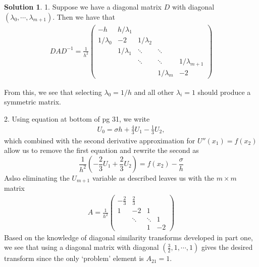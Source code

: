 \documentclass[12pt]{article}
\theoremstyle{definition}
\newtheorem{sol}{Solution}
\theoremstyle{remark}
\begin{document}
\begin{sol}
    1. Suppose we have a diagonal matrix $D$ with diagonal $(\lambda_{0}, \cdots, \lambda_{m+1})$. Then we have that
    \begin{align*}
    D A D^{-1} = 
\frac{1}{h^2} \left( \begin{array}{ccccc}
-h & h  / \lambda_{1} &        &        &      \\
1 / \lambda_{0} & -2  & 1 / \lambda_{2}      &        &      \\
   & 1 / \lambda_{1}  & \ddots & \ddots &      \\
   &    & \ddots & \ddots & 1 / \lambda_{m+1}    \\
   &    &        & 1 / \lambda_{m}     & -2 \end{array} \right)
    \end{align*}
\end{sol}
From this, we see that selecting $\lambda_{0} = 1 / h$ and all other $\lambda_{i} = 1$ should produce a symmetric matrix.


2. Using equation at bottom of pg 31, we write
\begin{align*}
U_{0} = \sigma h + \frac{4}{3}U_{1} - \frac{1}{3}U_{2},
\end{align*}
which combined with the second derivative approximation for $U''(x_{1}) = f(x_{2})$ allow us to remove the first equation and rewrite the second as
\begin{equation*}
    \frac{1}{h^{2}} \left(- \frac{2}{3} U_{1} + \frac{2}{3}U_{2}\right ) = f(x_{2}) - \frac{\sigma}{h}
\end{equation*}
Aslso eliminating the $U_{m+1}$ variable as described leaves us with the $m \times m$ matrix
\begin{align*}
A = \frac{1}{h^2} \left( \begin{array}{ccccc}
        -\frac{2}{3} & \frac{2}{3}      &   &          \\
    1  & -2 & 1 &      \\
       & \ddots & \ddots & 1    \\
       &        & 1      & -2 \end{array} \right)
\end{align*}
Based on the knowledge of diagonal similarity transforms developed in part one, we see that using a diagonal matrix with diagonal $(\frac{3}{2}, 1, \cdots, 1)$ gives the desired transform since the only `problem' element is $A_{21} = 1$.

\newpage
\end{document}

